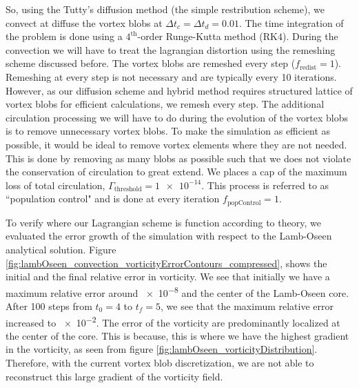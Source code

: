 So, using the Tutty's diffusion method (the simple restribution scheme), we convect at diffuse the vortex blobs at $\Delta t_c=\Delta t_d = 0.01$. The time integration of the problem is done using a $4^{\mathrm{th}}$-order Runge-Kutta method ($\mathrm{RK4}$). During the convection we will have to treat the lagrangian distortion using the remeshing scheme discussed before. The vortex blobs are remeshed every step ($f_{\mathrm{redist}}=1$). Remeshing at every step is not necessary and are typically every 10 iterations. However, as our diffusion scheme and hybrid method requires structured lattice of vortex blobs for efficient calculations, we remesh every step. The additional circulation processing we will have to do during the evolution of the vortex blobs is to remove unnecessary vortex blobs. To make the simulation as efficient as possible, it would be ideal to remove vortex elements where they are not needed. This is done by removing as many blobs as possible such that we does not violate the conservation of circulation to great extend. We places a cap of the maximum loss of total circulation, $\Gamma_{\mathrm{threshold}}=\num{1e-14}$. This process is referred to as ``population control" and is done at every iteration $f_{\mathrm{popControl}}=1$.

To verify where our Lagrangian scheme is function according to theory, we evaluated the error growth of the simulation with respect to the Lamb-Oseen analytical solution. Figure \ref{fig:lambOseen_convection_vorticityErrorContours_compressed}, shows the initial and the final relative error in vorticity. We see that initially we have a maximum relative error around \num{e-8} and the center of the Lamb-Oseen core. After 100 steps from $t_0=4$ to $t_f=5$, we see that the maximum relative error increased to \num{e-2}. The error of the vorticity are predominantly localized at the center of the core. This is because, this is where we have the highest gradient in the vorticity, as seen from figure \ref{fig:lambOseen_vorticityDistribution}. Therefore, with the current vortex blob discretization, we are not able to reconstruct this large gradient of the vorticity field. 


